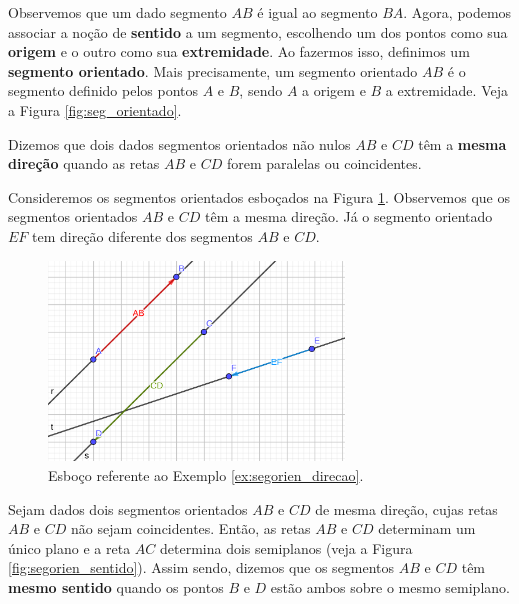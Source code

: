 Observemos que um dado segmento $AB$ é igual ao segmento $BA$. Agora, podemos associar a noção de {\bf sentido} a um segmento, escolhendo um dos pontos como sua {\bf origem} e o outro como sua {\bf extremidade}. Ao fazermos isso, definimos um {\bf segmento orientado}. Mais precisamente, um segmento orientado $AB$ é o segmento definido pelos pontos $A$ e $B$, sendo $A$ a origem e $B$ a extremidade. Veja a Figura \ref{fig:seg_orientado}.

Dizemos que dois dados segmentos orientados não nulos $AB$ e $CD$ têm a {\bf mesma direção} quando as retas $AB$ e $CD$ forem paralelas ou coincidentes.

\begin{ex}\label{ex:segorien_direcao}
  Consideremos os segmentos orientados esboçados na Figura \ref{fig:ex_segorien_direcao}. Observemos que os segmentos orientados $AB$ e $CD$ têm a mesma direção. Já o segmento orientado $EF$ tem direção diferente dos segmentos $AB$ e $CD$.
  
  \begin{figure}[h!]
    \centering
    \includegraphics[width=0.7\textwidth]{./cap_vetor/dados/fig_ex_segorien_direcao/fig_ex_segorien_direcao}
  \caption{Esboço referente ao Exemplo \ref{ex:segorien_direcao}.}
  \label{fig:ex_segorien_direcao}
\end{figure}  
\end{ex}

Sejam dados dois segmentos orientados $AB$ e $CD$ de mesma direção, cujas retas $AB$ e $CD$ não sejam coincidentes. Então, as retas $AB$ e $CD$ determinam um único plano e a reta $AC$ determina dois semiplanos (veja a Figura \ref{fig:segorien_sentido}). Assim sendo, dizemos que os segmentos $AB$ e $CD$ têm {\bf mesmo sentido} quando os pontos $B$ e $D$ estão ambos sobre o mesmo semiplano.

